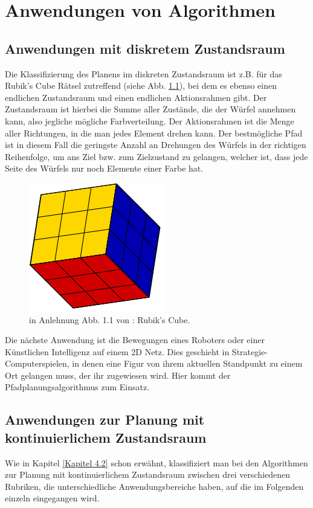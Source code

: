 
\chapter{Anwendungen von Algorithmen}
\section{Anwendungen mit diskretem Zustandsraum}
Die Klassifizierung des Planens im  diskreten Zustandsraum ist z.B. für das Rubik's Cube Rätsel zutreffend (siehe Abb. \ref{Abb. 5.1}), bei dem es ebenso einen endlichen Zustandsraum und einen endlichen Aktionsrahmen gibt. Der Zustandsraum ist hierbei die Summe aller Zustände, die der Würfel annehmen kann, also jegliche mögliche Farbverteilung. Der Aktionsrahmen ist die Menge aller Richtungen, in die man jedes Element drehen kann. Der bestmögliche Pfad ist in diesem Fall die geringste Anzahl an Drehungen des Würfels in der richtigen Reihenfolge, um ans Ziel bzw. zum Zielzustand zu gelangen, welcher ist, dass jede Seite des Würfels nur noch Elemente einer Farbe hat.\cite[~S. 20]{Lav06}\\
\begin{figure}
	\centering
	\includegraphics[width=0.4\linewidth]{images/img229}
	\caption{in Anlehnung Abb. 1.1 von \cite[~S. 5]{Lav06}: Rubik's Cube.}
	\label{Abb. 5.1}
\end{figure}

Die nächste Anwendung ist die Bewegungen eines Roboters oder einer Künstlichen Intelligenz auf einem 2D Netz. Dies geschieht in Strategie-Computerspielen, in denen eine Figur von ihrem aktuellen Standpunkt zu einem Ort gelangen muss, der ihr zugewiesen wird. Hier kommt der Pfadplanungsalgorithmus zum Einsatz.\cite{cui2011based}%
\section{Anwendungen zur Planung mit kontinuierlichem Zustandsraum}
Wie in Kapitel \ref{Kapitel 4.2} schon erwähnt, klassifiziert man bei den Algorithmen zur Planung mit kontinuierlichem Zustandsraum zwischen drei verschiedenen Rubriken, die unterschiedliche Anwendungsbereiche haben, auf die im Folgenden einzeln eingegangen wird.
